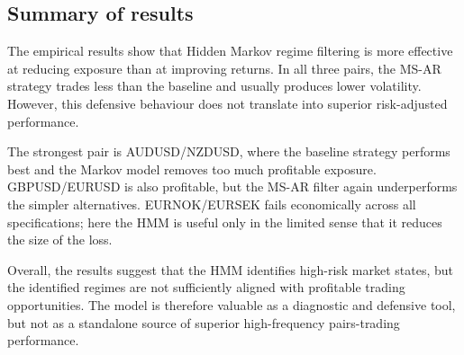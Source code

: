 \subsection{Summary of results}

The empirical results show that Hidden Markov regime filtering is more effective at reducing exposure than at improving returns. In all three pairs, the MS-AR strategy trades less than the baseline and usually produces lower volatility. However, this defensive behaviour does not translate into superior risk-adjusted performance.

The strongest pair is AUDUSD/NZDUSD, where the baseline strategy performs best and the Markov model removes too much profitable exposure. GBPUSD/EURUSD is also profitable, but the MS-AR filter again underperforms the simpler alternatives. EURNOK/EURSEK fails economically across all specifications; here the HMM is useful only in the limited sense that it reduces the size of the loss.

Overall, the results suggest that the HMM identifies high-risk market states, but the identified regimes are not sufficiently aligned with profitable trading opportunities. The model is therefore valuable as a diagnostic and defensive tool, but not as a standalone source of superior high-frequency pairs-trading performance.